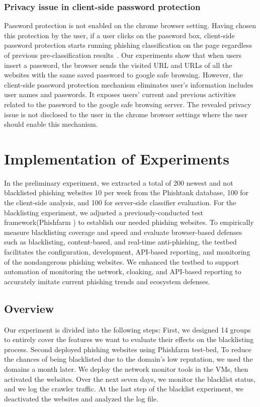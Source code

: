 \subsubsection{Privacy issue in client-side password protection }
Password protection is not enabled on the chrome browser setting. Having chosen this protection by the user, if a user clicks on the password box, client-side password protection starts running phishing classification on the page regardless of previous pre-classification results~\cite{mardini_2019}. 
Our experiments show that when users insert a password, the browser sends the visited URL and URLs of all the websites with the same saved password to google safe browsing.   
However, the client-side password protection mechanism eliminates user's information includes user names and passwords. It exposes users' current and previous activities related to the password to the google safe browsing server. The revealed privacy issue is not disclosed to the user in the chrome browser settings where the user should enable this mechanism.

\section{Implementation of Experiments}
In the preliminary experiment, we extracted a total of 200 newest and not blacklisted phishing websites 10 per week from the Phishtank database, 100 for the client-side analysis, and 100 for server-side classifier evaluation. 
For the blacklisting experiment, we adjusted a previously-conducted test framework(Phishfarm \cite{oest2019phishfarm}) to establish our needed phishing websites.
To empirically measure blacklisting coverage and speed
and evaluate browser-based defenses such as blacklisting, content-based, and real-time anti-phishing, the testbed facilitates the configuration, development, API-based reporting, and monitoring of the nondangerous phishing websites.  We enhanced the testbed to support automation of monitoring the network, cloaking, and API-based reporting to accurately imitate current phishing trends and ecosystem defenses.

\subsection{Overview}

Our experiment is divided into the following steps: 
First, we designed 14 groups to entirely cover the features we want to evaluate their effects on the blacklisting process. Second deployed phishing websites using Phishfarm test-bed, 
To reduce the chances of being blacklisted due to the domain's low reputation, we used the domains a month later.
We deploy the network monitor tools in the VMs, then activated the websites. Over the next seven days, we monitor the blacklist status, and we log the crawler traffic.
At the last step of the blacklist experiment, we deactivated the websites and analyzed the log file.

